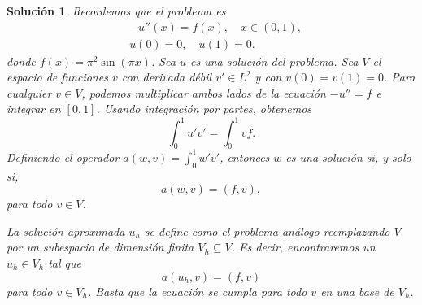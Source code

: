 \documentclass[11pt]{article}
\newtheorem*{sol}{Solución}
\newcommand\<{\langle}
\renewcommand\>{\rangle}
\begin{document}
\begin{sol}
  Recordemos que el problema es
  \[
  \begin{aligned}
    &-u''(x) = f(x), \quad x\in(0,1),
    \\
    &u(0) = 0, \quad u(1)=0.
  \end{aligned}
  \]
  donde $f(x)=\pi^{2}\sin(\pi x)$.
  Sea $u$ es una solución del problema.
  Sea $V$ el espacio de funciones $v$ con derivada débil $v'\in L^{2}$
  y con $v(0)=v(1)=0$.
  Para cualquier $v\in V$, podemos multiplicar ambos lados de la
  ecuación $-u''=f$ e integrar en $[0,1]$. Usando integración por
  partes, obtenemos
  \begin{equation}
    \int_0^{1}u'v' = \int_0^{1} vf
  .\end{equation}
  Definiendo el operador $a(w,v)=\int_{0}^{1}w'v'$, entonces $w$ es
  una solución si, y solo si,
  \begin{equation}
    a(w,v) = (f,v)
  ,\end{equation}
  para todo $v\in V$.
  
  La solución aproximada $u_h$ se define como el problema análogo
  reemplazando $V$ por un subespacio de dimensión finita
  $V_h\subseteq V$.  Es decir, encontraremos un $u_h\in V_h$ tal que
  \begin{equation}
    a(u_h,v) = (f,v)
  \end{equation}
  para todo $v\in V_h$. Basta que la ecuación se cumpla para todo $v$ 
  en una base de $V_h$.


\end{sol}
\end{document}
